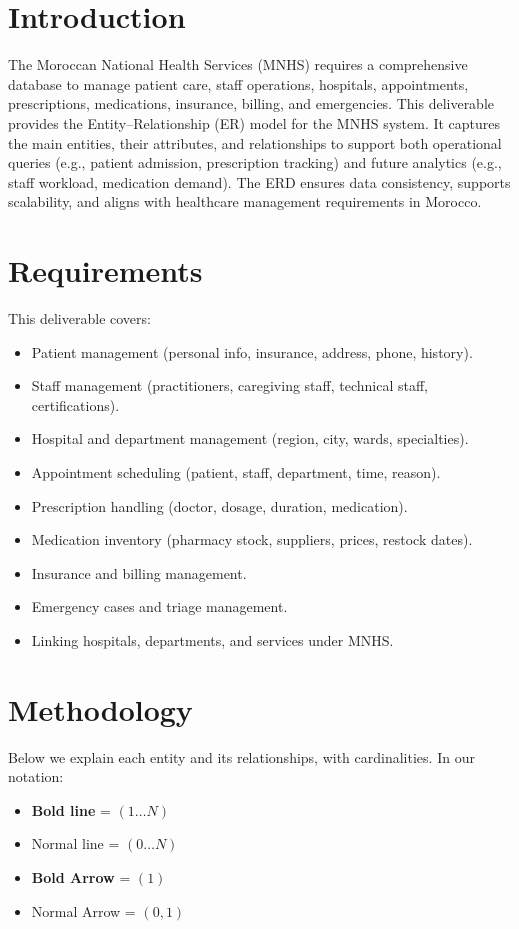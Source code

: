 \documentclass[a4paper,12pt]{article}
\begin{document}
\section{Introduction}
The Moroccan National Health Services (MNHS) requires a comprehensive database to manage patient care, staff operations, hospitals, appointments, prescriptions, medications, insurance, billing, and emergencies. This deliverable provides the Entity–Relationship (ER) model for the MNHS system. It captures the main entities, their attributes, and relationships to support both operational queries (e.g., patient admission, prescription tracking) and future analytics (e.g., staff workload, medication demand). The ERD ensures data consistency, supports scalability, and aligns with healthcare management requirements in Morocco.
\section{Requirements}
This deliverable covers:
\begin{itemize}
    \item Patient management (personal info, insurance, address, phone, history).
    \item Staff management (practitioners, caregiving staff, technical staff, certifications).
    \item Hospital and department management (region, city, wards, specialties).
    \item Appointment scheduling (patient, staff, department, time, reason).
    \item Prescription handling (doctor, dosage, duration, medication).
    \item Medication inventory (pharmacy stock, suppliers, prices, restock dates).
    \item Insurance and billing management.
    \item Emergency cases and triage management.
    \item Linking hospitals, departments, and services under MNHS.
\end{itemize}



\section{Methodology}
Below we explain each entity and its relationships, with cardinalities. 
In our notation: 
\begin{itemize}
    \item \textbf{Bold line} = $(1 \dots N)$ 
    \item Normal line = $(0 \dots N)$
    \item \textbf{Bold Arrow} = $(1)$ 
    \item Normal Arrow = $(0,1)$
\end{itemize}
\end{document}
